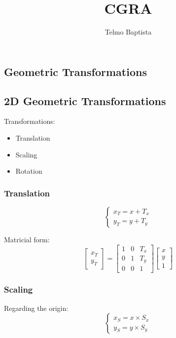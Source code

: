 \documentclass[a4paper]{article}
\title{CGRA}
\author{Telmo Baptista}
\begin{document}
\maketitle
\begin{flushleft}
\newpage
\section{Geometric Transformations}
\subsection{2D Geometric Transformations}
Transformations:
\begin{itemize}
	\item Translation
	\item Scaling
	\item Rotation
\end{itemize}

\subsubsection{Translation}
\begin{equation}
\begin{cases}
	x_T = x + T_x \\
	y_T = y + T_y
\end{cases}
\end{equation}

Matricial form:  
\begin{equation}
\begin{bmatrix}
	x_T \\
	y_T
\end{bmatrix}
=
\begin{bmatrix}
	1 & 0 & T_x \\
	0 & 1 & T_y \\
	0 & 0 & 1
\end{bmatrix}
\begin{bmatrix}
	x \\
	y \\
	1
\end{bmatrix}
\end{equation}

\subsubsection{Scaling}
Regarding the origin:
\begin{equation}
\begin{cases}
	x_S = x \times S_x \\
	y_S = y \times S_y
\end{cases}
\end{equation}


\end{flushleft}
\end{document}
